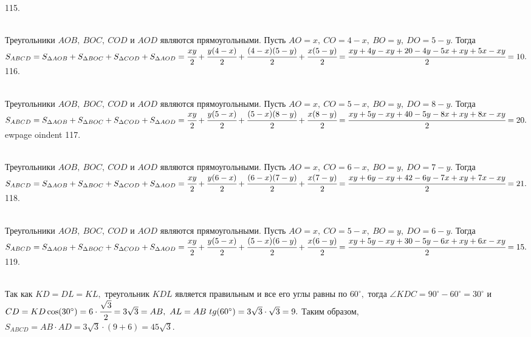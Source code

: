 115. \begin{figure}[ht!]
\end{figure}\\
Треугольники $AOB,\ BOC,\ COD$ и $AOD$ являются прямоугольными. Пусть $AO=x,\ CO=4-x,\ BO=y,\ DO=5-y.$ Тогда $S_{ABCD}=S_{\Delta AOB}+S_{\Delta BOC}+S_{\Delta COD}+S_{\Delta AOD}=\cfrac{xy}{2}+\cfrac{y(4-x)}{2}+\cfrac{(4-x)(5-y)}{2}+\cfrac{x(5-y)}{2}=\cfrac{xy+4y-xy+20-4y-5x+xy+5x-xy}{2}=10.$\\
116. \begin{figure}[ht!]
\end{figure}\\
Треугольники $AOB,\ BOC,\ COD$ и $AOD$ являются прямоугольными. Пусть $AO=x,\ CO=5-x,\ BO=y,\ DO=8-y.$ Тогда $S_{ABCD}=S_{\Delta AOB}+S_{\Delta BOC}+S_{\Delta COD}+S_{\Delta AOD}=\cfrac{xy}{2}+\cfrac{y(5-x)}{2}+\cfrac{(5-x)(8-y)}{2}+\cfrac{x(8-y)}{2}=\cfrac{xy+5y-xy+40-5y-8x+xy+8x-xy}{2}=20.$
ewpage
oindent
117. \begin{figure}[ht!]
\end{figure}\\
Треугольники $AOB,\ BOC,\ COD$ и $AOD$ являются прямоугольными. Пусть $AO=x,\ CO=6-x,\ BO=y,\ DO=7-y.$ Тогда $S_{ABCD}=S_{\Delta AOB}+S_{\Delta BOC}+S_{\Delta COD}+S_{\Delta AOD}=\cfrac{xy}{2}+\cfrac{y(6-x)}{2}+\cfrac{(6-x)(7-y)}{2}+\cfrac{x(7-y)}{2}=\cfrac{xy+6y-xy+42-6y-7x+xy+7x-xy}{2}=21.$\\
118. \begin{figure}[ht!]
\end{figure}\\
Треугольники $AOB,\ BOC,\ COD$ и $AOD$ являются прямоугольными. Пусть $AO=x,\ CO=5-x,\ BO=y,\ DO=6-y.$ Тогда $S_{ABCD}=S_{\Delta AOB}+S_{\Delta BOC}+S_{\Delta COD}+S_{\Delta AOD}=\cfrac{xy}{2}+\cfrac{y(5-x)}{2}+\cfrac{(5-x)(6-y)}{2}+\cfrac{x(6-y)}{2}=\cfrac{xy+5y-xy+30-5y-6x+xy+6x-xy}{2}=15.$\\
119. \begin{figure}[ht!]
\end{figure}\\
Так как $KD=DL=KL,$ треугольник $KDL$ является правильным и все его углы равны по $60^\circ,$ тогда $\angle KDC=90^\circ-60^\circ=30^\circ$ и $CD=KD\cos(30^\circ)=6\cdot\cfrac{\sqrt{3}}{2}=3\sqrt{3}=AB,\ AL=AB\ tg(60^\circ)=3\sqrt{3}\cdot\sqrt{3}=9.$ Таким образом, $S_{ABCD}=AB\cdot AD=3\sqrt{3}\cdot(9+6)=45\sqrt{3}.$\\
